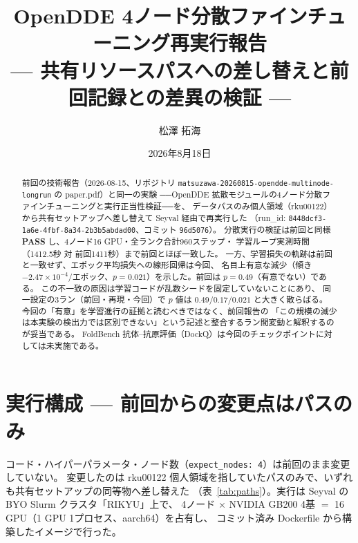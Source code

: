 \documentclass[11pt]{article}
\title{\textbf{OpenDDE 4ノード分散ファインチューニング再実行報告}\\
{\large --- 共有リソースパスへの差し替えと前回記録との差異の検証 ---}}
\author{松澤 拓海}
\date{2026年8月18日}
\begin{document}
\maketitle

\begin{abstract}
前回の技術報告（2026-08-15、リポジトリ \texttt{matsuzawa-20260815-opendde-multinode-longrun} の paper.pdf）と同一の実験
──OpenDDE 拡散モジュールの4ノード分散ファインチューニングと実行正当性検証──を、
データパスのみ個人領域（rku00122）から共有セットアップへ差し替えて Seyval 経由で再実行した
（run\_id: \texttt{8448dcf3-1a6e-4fbf-8a34-2b3b5abdad00}、コミット \texttt{96d5076}）。
分散実行の検証は前回と同様 \textbf{PASS} し、4ノード16 GPU・全ランク合計960ステップ・
学習ループ実測時間（1412.5秒 対 前回1411秒）まで前回とほぼ一致した。
一方、学習損失の軌跡は前回と一致せず、エポック平均損失への線形回帰は今回、
名目上有意な減少（傾き $-2.47\times10^{-4}$/エポック、$p=0.021$）を示した。前回は $p=0.49$（有意でない）である。
この不一致の原因は学習コードが乱数シードを固定していないことにあり、
同一設定の3ラン（前回・再現・今回）で $p$ 値は $0.49/0.17/0.021$ と大きく散らばる。
今回の「有意」を学習進行の証拠と読むべきではなく、前回報告の
「この規模の減少は本実験の検出力では区別できない」という記述と整合するラン間変動と解釈するのが妥当である。
FoldBench 抗体--抗原評価（DockQ）は今回のチェックポイントに対しては未実施である。
\end{abstract}

\section{実行構成 --- 前回からの変更点はパスのみ}

コード・ハイパーパラメータ・ノード数（\texttt{expect\_nodes: 4}）は前回のまま変更していない。
変更したのは rku00122 個人領域を指していたパスのみで、いずれも共有セットアップの同等物へ差し替えた
（表~\ref{tab:paths}）。実行は Seyval の BYO Slurm クラスタ「RIKYU」上で、
4ノード $\times$ NVIDIA GB200 4基 $=$ 16 GPU（1 GPU 1プロセス、aarch64）を占有し、
コミット済み Dockerfile から構築したイメージで行った。
\end{document}
